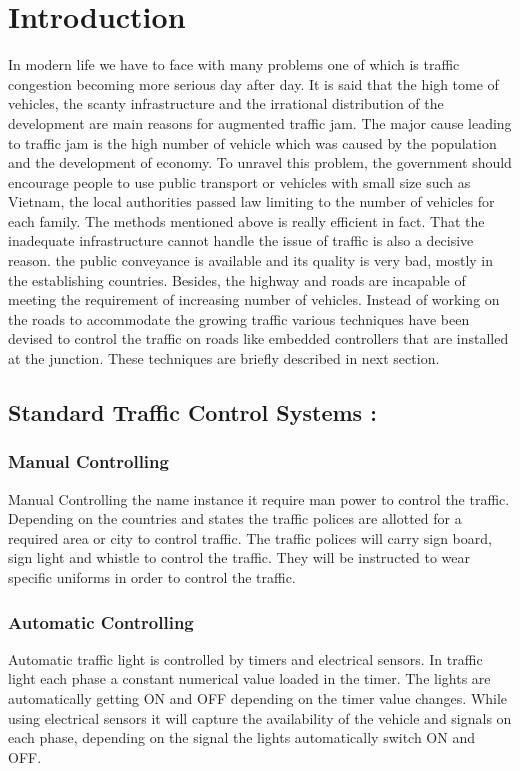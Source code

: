\documentclass[12pt,a4paper,roman]{article}
\begin{document}
\section{Introduction}
{
In modern life we have to face with many problems one of which is traffic congestion becoming more serious day after day. It is said that the high tome of vehicles, the scanty infrastructure and the irrational distribution of the development are main reasons for augmented traffic jam. The major cause leading to traffic jam is the high number of vehicle which was caused by the population and the development of economy. To unravel this problem, the government should encourage people to use public transport or vehicles with small size such as Vietnam, the local authorities passed law limiting to the number of vehicles for each family. The methods mentioned above is really efficient in fact. That the inadequate infrastructure cannot handle the issue of traffic is also a decisive reason. the public conveyance is available and its quality is very bad, mostly in the establishing countries. Besides, the highway and roads are incapable of meeting the requirement of increasing number of vehicles. Instead of working on the roads to accommodate the growing traffic various techniques have been devised to control the traffic on roads like embedded controllers that are installed at the junction. These techniques are briefly described in next section.
\subsection{\textbf{Standard Traffic Control Systems :}
}
\subsubsection{
Manual Controlling}{
Manual Controlling the name instance it require man power to control the traffic. Depending on the countries and states the traffic polices are allotted for a required area or city to control traffic. The traffic polices will carry sign board, sign light and whistle to control the traffic. They will be instructed to wear specific uniforms in order to control the traffic. }
\subsubsection{
Automatic Controlling}{
Automatic traffic light is controlled by timers and electrical  sensors. In traffic light each phase a constant numerical value loaded in the timer. The lights are automatically getting ON and OFF depending on the timer value changes. While using electrical sensors it will capture the availability of the vehicle and signals on each phase, depending on the signal the lights automatically switch ON and OFF.}

}
\end{document}
